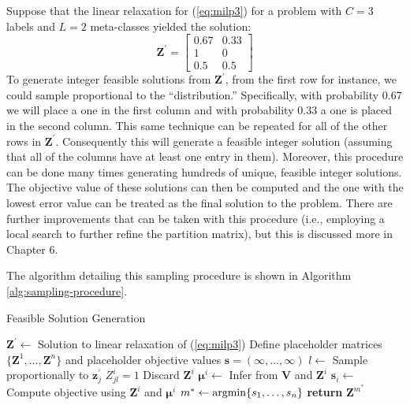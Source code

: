 \documentclass[../thesis.tex]{subfiles}
\begin{document}
Suppose that the linear relaxation for (\ref{eq:milp3}) for a problem with $C=3$ labels and $L=2$ meta-classes yielded the solution:
\begin{equation*}
    \mathbf{Z}^\prime = 
    \begin{bmatrix}
        0.67 & 0.33 \\
        1 & 0 \\
        0.5 & 0.5
    \end{bmatrix}
\end{equation*}
To generate integer feasible solutions from $\mathbf{Z}^\prime$, from the first row for instance, we could sample proportional to the ``distribution.'' Specifically, with probability $0.67$ we will place a one in the first column and with probability $0.33$ a one is placed in the second column. This same technique can be repeated for all of the other rows in $\mathbf{Z}^\prime$. Consequently this will generate a feasible integer solution (assuming that all of the columns have at least one entry in them). Moreover, this procedure can be done many times generating hundreds of unique, feasible integer solutions. The objective value of these solutions can then be computed and the one with the lowest error value can be treated as the final solution to the problem. There are further improvements that can be taken with this procedure (i.e., employing a local search to further refine the partition matrix), but this is discussed more in Chapter 6. 

The algorithm detailing this sampling procedure is shown in Algorithm \ref{alg:sampling-procedure}.

\begin{algorithm}
    \caption{Feasible Solution Generation}
    \label{alg:sampling-procedure}
    \begin{algorithmic}[1]
            \State $\mathbf{Z}^\prime \gets$ Solution to linear relaxation of (\ref{eq:milp3})
            \State Define placeholder matrices $\{\mathbf{Z}^1, \ldots, \mathbf{Z}^n\}$ and placeholder objective values $\mathbf{s} = (\infty, \ldots, \infty)$
                    \State $l \gets $ Sample proportionally to $\mathbf{z}_j^\prime$
                    \State $Z^i_{jl} = 1$
                \EndFor
                 
                    \State Discard $\mathbf{Z}^i$
                \Else{}
                    \State $\boldsymbol{\mu}^i \gets$ Infer from $\mathbf{V}$ and $\mathbf{Z}^i$
                    \State $\mathbf{s}_i \gets$ Compute objective using $\mathbf{Z}^i$ and $\boldsymbol{\mu}^i$
                \EndIf
            \EndFor
            \State $m^* \gets \operatorname*{argmin} \{s_1, \ldots, s_n \}$
            \State \textbf{return} $\mathbf{Z}^{m^*}$
        \EndProcedure
    \end{algorithmic}
\end{algorithm}
\end{document}
